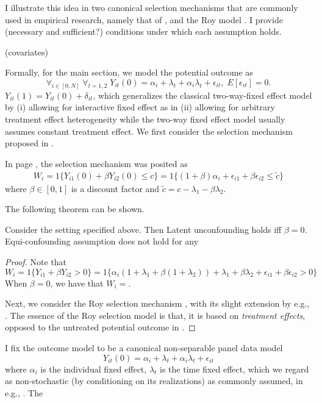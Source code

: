 \documentclass{article}
\begin{document}
I illustrate this idea in two canonical selection mechanisms that are commonly used in empirical research, namely that of \cite{citecard and ash}, and the Roy model \cite{roy1951some}.
I provide \koko(necessary and sufficient?) conditions under which each assumption holds.

\koko(covariates)

Formally, for the main section, we model the potential outcome as
\[\forall_{i\in[0,N]}\;\forall_{t=1,2}\;Y_{it} (0) = \alpha_i + \lambda_t + \alpha_i \lambda_t +\epsilon_{it},\; E[ \epsilon_{it} ] = 0.\]
$Y_{it}(1) = Y_{it}(0) + \delta_{it}$, which generalizes the classical two-way-fixed effect model by (i) allowing for interactive fixed effect as in \cite{cite bai 2009, abadie 2021}(ii) allowing for arbitrary treatment effect heterogeneity while the two-way fixed effect model usually assumes constant treatment effect. 
We first consider the selection mechanism proposed in \cite{citecardand ash}.

In \cite{ashenfelter and card 19 85} page \koko , the selection mechanism was posited as 
\begin{align*}
     W_i = 1\{ Y_{i1}(0) + \beta Y_{i2} ( 0) \leq c \} =  1 \{  (1 + \beta ) \alpha_i + \epsilon_{i1} + \beta \epsilon_{i2} \leq \tilde{c} \}
\end{align*}
where $\beta \in [0,1]$ is a discount factor and $\tilde{c} = c - \lambda_1 - \beta \lambda_2$.

The following theorem can be shown.
\begin{theorem}
Consider the setting specified above. Then Latent unconfounding holds iff $\beta =0$. Equi-confounding assumption does not hold for any 
\end{theorem}
\begin{proof}
    Note that
    \[W_i = 1\{ Y_{i1} + \beta Y_{i2} > 0\} = 1\{ \alpha_i ( 1 + \lambda_1 + \beta( 1 + \lambda_2 ) ) + \lambda_1 + \beta \lambda_2 + \epsilon_{i1} + \beta \epsilon_{i2} > 0 \}\]
    When $\beta=0$, we have that $W_i =$.
    
    Next, we consider the Roy selection mechanism \cite{roy1951some}, with its slight extension by e.g., \cite{heckman1984method}.
    The essence of the Roy selection model is that, it is based on \textit{treatment effects}, opposed to the untreated potential outcome in \cite{card ashenfelter}.
\end{proof}

I fix the outcome model to be a canonical non-separable panel data model
\[Y_{it} (0) = \alpha_i + \lambda_t + \alpha_i \lambda_t + \epsilon_{it}\]
where $\alpha_i $ is the individual fixed effect, $\lambda_t$ is the time fixed effect, which we regard as non-stochastic (by conditioning on its realizations) as commonly assumed, in e.g., \cite{citeghanem2022, bonhomme}. The 
\end{document}
